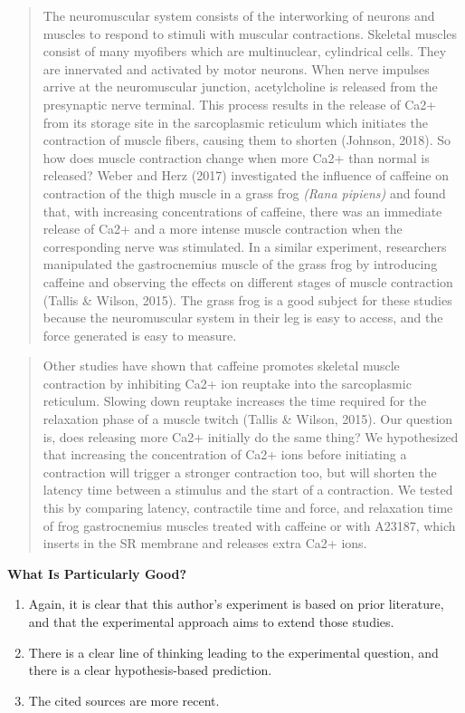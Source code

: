 \documentclass[
]{book}
\providecommand{\tightlist}{%
  \setlength{\itemsep}{0pt}\setlength{\parskip}{0pt}}
\begin{document}
\begin{quote}
The neuromuscular system consists of the interworking of neurons and muscles to respond to stimuli with muscular contractions. Skeletal muscles consist of many myofibers which are multinuclear, cylindrical cells. They are innervated and activated by motor neurons. When nerve impulses arrive at the neuromuscular junction, acetylcholine is released from the presynaptic nerve terminal. This process results in the release of Ca2+ from its storage site in the sarcoplasmic reticulum which initiates the contraction of muscle fibers, causing them to shorten (Johnson, 2018). So how does muscle contraction change when more Ca2+ than normal is released? Weber and Herz (2017) investigated the influence of caffeine on contraction of the thigh muscle in a grass frog \emph{(Rana pipiens)} and found that, with increasing concentrations of caffeine, there was an immediate release of Ca2+ and a more intense muscle contraction when the corresponding nerve was stimulated. In a similar experiment, researchers manipulated the gastrocnemius muscle of the grass frog by introducing caffeine and observing the effects on different stages of muscle contraction (Tallis \& Wilson, 2015). The grass frog is a good subject for these studies because the neuromuscular system in their leg is easy to access, and the force generated is easy to measure.
\end{quote}

\begin{quote}
Other studies have shown that caffeine promotes skeletal muscle contraction by inhibiting Ca2+ ion reuptake into the sarcoplasmic reticulum. Slowing down reuptake increases the time required for the relaxation phase of a muscle twitch (Tallis \& Wilson, 2015). Our question is, does releasing more Ca2+ initially do the same thing? We hypothesized that increasing the concentration of Ca2+ ions before initiating a contraction will trigger a stronger contraction too, but will shorten the latency time between a stimulus and the start of a contraction. We tested this by comparing latency, contractile time and force, and relaxation time of frog gastrocnemius muscles treated with caffeine or with A23187, which inserts in the SR membrane and releases extra Ca2+ ions.
\end{quote}

\textbf{What Is Particularly Good?}

\begin{enumerate}
\def\labelenumi{\arabic{enumi}.}
\tightlist
\item
  Again, it is clear that this author's experiment is based on prior literature, and that the experimental approach aims to extend those studies.
\item
  There is a clear line of thinking leading to the experimental question, and there is a clear hypothesis-based prediction.
\item
  The cited sources are more recent.
\end{enumerate}
\end{document}
